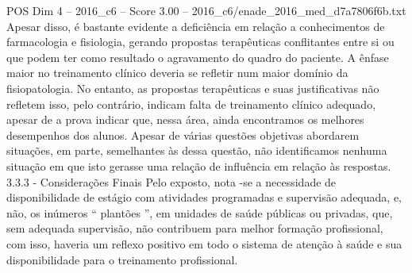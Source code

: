 \begin{textsample}{POS Dim 4 – 2016\_c6 – Score 3.00 – 2016\_c6/enade\_2016\_med\_d7a7806f6b.txt}
Apesar disso, é bastante evidente a deficiência em relação a conhecimentos de farmacologia e fisiologia, gerando propostas terapêuticas conflitantes entre si ou que podem ter como resultado o agravamento do quadro do paciente.
A ênfase maior no treinamento clínico deveria se refletir num maior domínio da fisiopatologia.
No entanto, as propostas terapêuticas e suas justificativas não refletem isso, pelo contrário, indicam falta de treinamento clínico adequado, apesar de a prova indicar que, nessa área, ainda encontramos os melhores desempenhos dos alunos.
Apesar de várias questões objetivas abordarem situações, em parte, semelhantes às dessa questão, não identificamos nenhuma situação em que isto gerasse uma relação de influência em relação às respostas. 3.3.3 - Considerações Finais Pelo exposto, nota -se a necessidade de disponibilidade de estágio com atividades programadas e supervisão adequada, e, não, os inúmeros “ plantões ”, em unidades de saúde públicas ou privadas, que, sem adequada supervisão, não contribuem para melhor formação profissional, com isso, haveria um reflexo positivo em todo o sistema de atenção à saúde e sua disponibilidade para o treinamento profissional.

\end{textsample}
